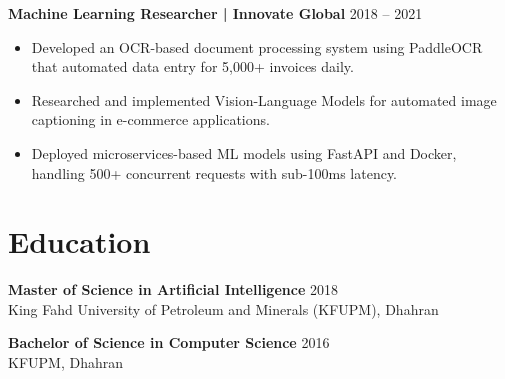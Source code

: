 \documentclass[a4paper,11pt]{article}
\begin{document}
\textbf{Machine Learning Researcher | Innovate Global} \hfill 2018 -- 2021 \\
\begin{itemize}[noitemsep,topsep=0pt]
    \item Developed an OCR-based document processing system using PaddleOCR that automated data entry for 5,000+ invoices daily.
    \item Researched and implemented Vision-Language Models for automated image captioning in e-commerce applications.
    \item Deployed microservices-based ML models using FastAPI and Docker, handling 500+ concurrent requests with sub-100ms latency.
\end{itemize}

\section*{Education}
\textbf{Master of Science in Artificial Intelligence} \hfill 2018 \\
King Fahd University of Petroleum and Minerals (KFUPM), Dhahran

\textbf{Bachelor of Science in Computer Science} \hfill 2016 \\
KFUPM, Dhahran
\end{document}

